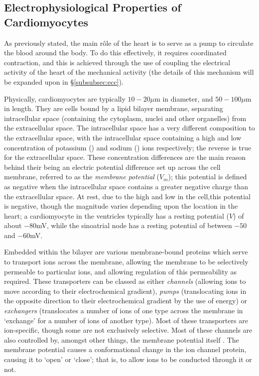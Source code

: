 \documentclass[../thesis-main.tex]{subfiles}
\begin{document}
\subsection{Electrophysiological Properties of Cardiomyocytes}
\label{subsec:electro-prop}
As previously stated, the main r\^ole of the heart is to serve as a pump to circulate the blood around the body. To do this effectively, it requires coordinated contraction, and this is achieved through the use of coupling the electrical activity of the heart of the mechanical activity (the details of this mechanism will be expanded upon in \S\ref{subsubsec:ecc}).

Physically, cardiomyocytes are typically $10-20\mu$m in diameter, and $50-100\mu$m in length. They are cells bound by a lipid bilayer membrane, separating intracellular space (containing the cytoplasm, nuclei and other organelles) from the extracellular space. The intracellular space has a very different composition to the extracellular space, with the intracellular space containing a high and low concentration of potassium (\K) and sodium (\na) ions respectively; the reverse is true for the extracellular space. These concentration differences are the main reason behind their being an electric potential difference set up across the cell membrane, referred to as the \emph{membrane potential} ($V_m$); this potential is defined as negative when the intracellular space contains a greater negative charge than the extracellular space. At rest, due to the high \K{} and low \na{} in the cell,this potential is negative, though the magnitude varies depending upon the location in the heart; a cardiomyocyte in the ventricles typically has a resting potential ($V$) of about $-80$mV, while the sinoatrial node has a resting potential of between $-50$ and $-60$mV.

Embedded within the bilayer are various membrane-bound proteins which serve to transport ions across the membrane, allowing the membrane to be selectively permeable to particular ions, and allowing regulation of this permeability as required. These transporters can be classed as either \emph{channels} (allowing ions to move according to their electrochemical gradient), \emph{pumps} (translocating ions in the opposite direction to their electrochemical gradient by the use of energy) or \emph{exchangers} (translocates a number of ions of one type across the membrane in `exchange' for a number of ions of another type). Most of these transporters are ion-specific, though some are not exclusively selective. Most of these channels are also controlled by, amongst other things, the membrane potential itself \citep{Bezanilla2000}. The membrane potential causes a conformational change in the ion channel protein, causing it to `open' or `close'; that is, to allow ions to be conducted through it or not.
\end{document}
